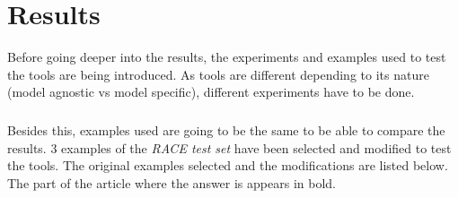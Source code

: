 
\chapter{Results}
\label{ch:Results}
\noindent Before going deeper into the results, the experiments and examples used to test the tools are being introduced. As tools are different depending to its nature (model agnostic vs model specific), different experiments have to be done.
\paragraph{}
Besides this, examples used are going to be the same to be able to compare the results. 3 examples of the \emph{RACE test set} have been selected and modified to test the tools. The original examples selected and the modifications are listed below. The part of the article where the answer is appears in bold.
